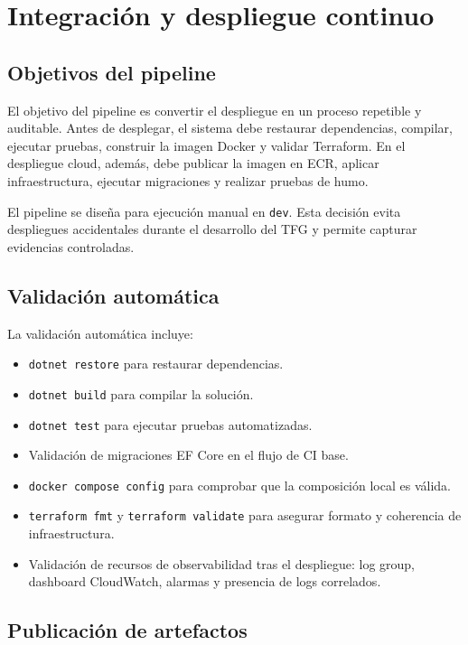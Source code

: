 \chapter{Integración y despliegue continuo}
\label{chap:cicd}

\section{Objetivos del pipeline}
\label{sec:objetivos-pipeline}

El objetivo del pipeline es convertir el despliegue en un proceso repetible y auditable. Antes de desplegar, el sistema debe restaurar dependencias, compilar, ejecutar pruebas, construir la imagen Docker y validar Terraform. En el despliegue cloud, además, debe publicar la imagen en ECR, aplicar infraestructura, ejecutar migraciones y realizar pruebas de humo.

El pipeline se diseña para ejecución manual en \texttt{dev}. Esta decisión evita despliegues accidentales durante el desarrollo del TFG y permite capturar evidencias controladas.

\section{Validación automática}
\label{sec:validacion-automatica}

La validación automática incluye:

\begin{itemize}
  \item \texttt{dotnet restore} para restaurar dependencias.
  \item \texttt{dotnet build} para compilar la solución.
  \item \texttt{dotnet test} para ejecutar pruebas automatizadas.
  \item Validación de migraciones EF Core en el flujo de CI base.
  \item \texttt{docker compose config} para comprobar que la composición local es válida.
  \item \texttt{terraform fmt} y \texttt{terraform validate} para asegurar formato y coherencia de infraestructura.
  \item Validación de recursos de observabilidad tras el despliegue: log group, dashboard CloudWatch, alarmas y presencia de logs correlados.
\end{itemize}

\section{Publicación de artefactos}
\label{sec:publicacion-artefactos}

